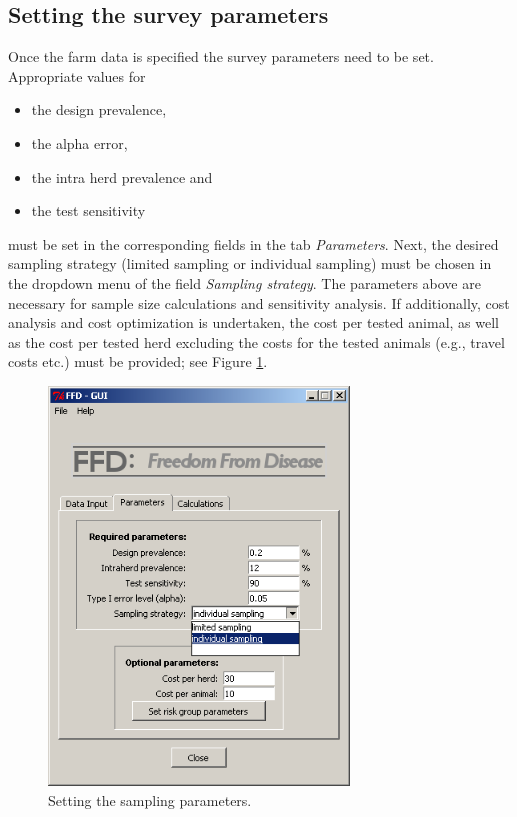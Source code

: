 \documentclass[nojss]{jss}
\begin{document}
\subsection{Setting the survey parameters} \label{subsec:GUI_survey_parameters}

Once the farm data is specified the survey parameters need to be set. Appropriate values for
%
\begin{itemize}
\item the design prevalence,
\item the alpha error,
\item the intra herd prevalence and
\item the test sensitivity
\end{itemize}
%
must be set in the corresponding fields in the tab  \emph{Parameters}. Next, the desired sampling strategy (limited sampling or individual sampling) must be chosen in the dropdown menu of the field  \emph{Sampling strategy}. The parameters above are necessary for sample size calculations and sensitivity analysis. If additionally, cost analysis and cost optimization is undertaken, the cost per tested animal, as well as the cost per tested herd excluding the costs for the tested animals (e.g., travel costs etc.) must be provided; see Figure \ref{fig:GUI_Parameters}.

\begin{figure}[h!t]
\begin{center}
\includegraphics[width=80mm]{GUI_Parameters.png}
\end{center}
\caption{Setting the sampling parameters.} \label{fig:GUI_Parameters}
\end{figure}
\end{document}
